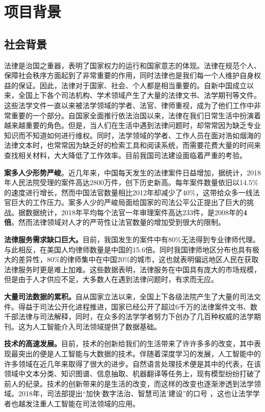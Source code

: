 \chapter{项目背景}
\label{cha:background}


\section{社会背景}
法律是治国之重器，表明了国家权力的运行和国家意志的体现。法律在规范个人、保障社会秩序方面起到了非常重要的作用，同时法律也是我们每一个人维护自身权益的保证。因此，法律对于国家、社会、个人都是相当重要的。自新中国成立以来，全国上下各个司法机构、学术领域产生了大量的法律文书、法学期刊等文件。这些法学文件一直以来被法学领域的学者、法官、律师重视，成为了他们工作中非常重要的一个部分。自国家全面推行依法治国以来，法律在我们日常生活中扮演着越来越重要的角色。但是，当人们在生活中遇到法律问题时，却常常因为缺乏专业知识而不知道如何进行维权。同时，法学领域的学者、工作人员在面对浩如烟海的法律文本时，也常常因为缺乏好的检索工具和阅读系统，而需要花费大量的时间来查找相关材料，大大降低了工作效率。目前我国司法建设面临着严重的考验。

\textbf{案多人少形势严峻}。近几年来，中国每天发生的法律案件日益增加，据统计，2018年人民法院受理的案件高达2800万件，创下历史新高。每年案件数量依旧以14.5\%的速度进行增长，然而中国法官数量相比2012年却减少了40\%，这带给众多一线法官巨大的工作压力。案多人少的严峻局面给国家的司法公平公正提出了巨大的挑战。据数据统计，2018年平均每个法官一年审理案件高达233件，是2008年的\textbf{4倍}。然而法律领域对人才的严苛性让法官数量的增加受到很大的限制。

\textbf{法律服务需求缺口巨大。}目前，我国发生的案件中有80\%无法得到专业律师代理。与此相反，在美国人均律师数量是中国的15.6倍。同时我国律师地区分布也具有极大的差异性，80\%的律师集中在中国20\%的城市，这也就表明偏远地区人民在获取法律服务时更是难上加难。这些数据表明，法律服务在中国具有庞大的市场规模，但是由于人才供应不足，大多数人在遇到法律问题时，有求而无应。

\textbf{大量司法数据的累积。}自从国家立法以来，全国上下各级法院产生了大量的司法文件。得益于司法公开化进程推进，国家已经公开了超过6千万的法律案件文书、数千部法律与司法解释，同时，在众多的法学学者努力下创办了几百种权威的法学期刊。这为人工智能介入司法领域提供了数据基础。

\textbf{技术的高速发展。}目前，技术的创新给我们的生活带来了许许多多的改变，其中表现最突出的便是人工智能与大数据的技术。伴随着深度学习的发展，人工智能中的许多领域在近几年来取得了很大的进步。自然语言处理技术便是其中的代表，在该领域中文本分类、知识图谱、信息抽取、机器翻译等任务上，现有模型纷纷打破了前人的纪录。技术的创新带来的是生活的改变，而这样的改变也逐渐渗透到法学领域。2018年，司法部提出“加快‘数字法治、智慧司法’建设”的口号 ，这也让法学学者也越发注重人工智能在司法领域的应用。


